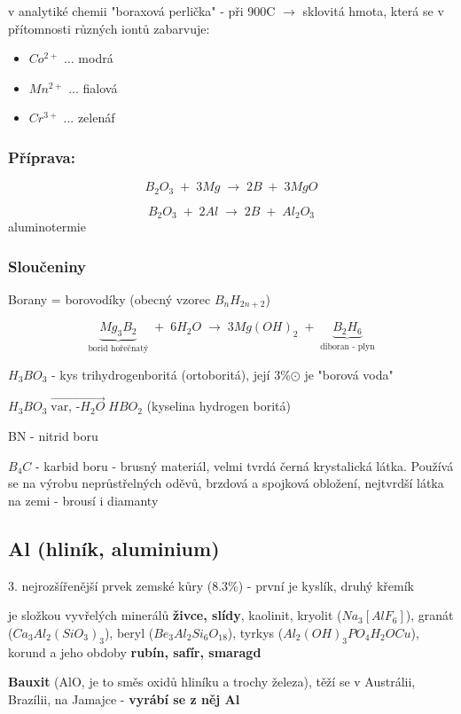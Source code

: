 v analytiké chemii "boraxová perlička" - při 900\˚C $\rightarrow$ sklovitá hmota,
která se v přítomnosti různých iontů zabarvuje:
\begin{itemize}
    \item $Co^{2+}$ ... modrá
    \item $Mn^{2+}$ ... fialová
    \item $Cr^{3+}$ ... zelenáf
\end{itemize}

\subsubsection{Příprava:}
\[B_2O_3 \; + \; 3Mg \; \longrightarrow \; 2B \; + \; 3MgO\]

\[B_2O_3 \; + \; 2Al \; \longrightarrow \; 2B \; + \; Al_2O_3\] aluminotermie

\subsubsection{Sloučeniny}
Borany = borovodíky (obecný vzorec $B_nH_{2n+2}$)

\[\underbrace{Mg_3B_2}_\text{borid hořečnatý} \; + \; 6H_2O \; \longrightarrow \; 3Mg\left(OH\right)_2 \; + \; \underbrace{B_2H_6}_\text{diboran - plyn}\]

$H_3BO_3$ - kys trihydrogenboritá (ortoboritá), její 3\%$\odot$ je "borová voda"

$H_3BO_3 \; \overrightarrow{\text{var, -$H_2O$}} \; HBO_2$ (kyselina hydrogen boritá)

BN - nitrid boru

$B_4C$ - karbid boru - brusný materiál, velmi tvrdá černá krystalická látka.
Používá se na výrobu neprůstřelných oděvů, brzdová a spojková obložení, nejtvrdší látka na zemi - brousí i diamanty

\subsection{Al (hliník, aluminium)}

3. nejrozšířenější prvek zemské kůry (8.3\%) - první je kyslík, druhý křemík

je složkou vyvřelých minerálů \textbf{živce, slídy}, kaolinit, kryolit ($Na_3\left[AlF_6\right]$), granát ($Ca_3Al_2\left(SiO_3\right)_3$),
beryl ($Be_3Al_2Si_6O_{18}$), tyrkys ($Al_2\left(OH\right)_3PO_4H_2OCu$), korund a jeho obdoby \textbf{rubín, safír, smaragd}

\textbf{Bauxit} (AlO, je to směs oxidů hliníku a trochy železa), těží se v Austrálii, Brazílii, na Jamajce - \textbf{vyrábí se z něj Al}

